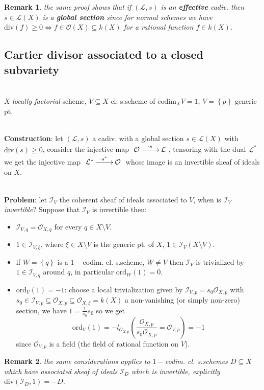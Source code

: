 \documentclass[oneside,a4paper,11pt]{amsbook}
\theoremstyle{pl}
\theoremstyle{df}
\theoremstyle{rm}
\newtheorem{rmk}{Remark}[chapter]
\newcommand{\nline}{
~\\
}%
\newcommand{\pa}[1]{
\left(#1\right)
}
\newcommand{\ga}[1]{
\left\{#1\right\}
}
\newcommand{\ol}[1]{
\overline{#1}
}
\newcommand{\mc}[1]{
\mathcal{#1}
}
\newcommand{\ord}[2]{
\text{ord}_{#1}\pa{#2}
}
\newcommand{\dv}[1]{
\text{div}\pa{#1}
}
\newcommand{\cod}[2]{
\text{codim}_{#1}{#2}
}
\begin{document}
\begin{rmk}
the same proof shows that if $\pa{\mc{L},s}$ is an \textbf{effective} cadiv. then $s\in\mc{L}(X)$ is a \textbf{global section} since for normal schemes we have $\dv{f}\ge 0\Longleftrightarrow f\in\mc{O}(X)\subseteq k(X)$ for a rational function $f\in k(X)$.
\end{rmk}

\subsection{Cartier divisor associated to a closed subvariety}
\nline
$X$ \emph{locally factorial} scheme, $V\subseteq X$ cl. s.scheme of $\cod{X}{V}=1$, $V=\ol{\ga{p}}$ generic pt. 
\nline
\textbf{Construction}: let $\pa{\mc{L},s}$ a cadiv. with a global section $s\in\mc{L}(X)$ with $\dv{s}\ge 0$, consider the injective map $\xymatrix{\mc{O}\ar[r]^{\cdot s} &\mc{L}\\}$, tensoring with the dual $\mc{L}^*$ we get the injective map $\xymatrix{\mc{L}^*\ar[r]^{\cdot s^*} &\mc{O}\\}$ whose image is an invertible sheaf of ideals on $X$.  

\nline
\textbf{Problem}: let $\mc{I}_V$ the coherent sheaf of ideals associated to $V$, when is $\mc{I}_V$ \emph{invertible}? Suppose that $\mc{I}_V$ is invertible then:
\begin{itemize}
\item{$\mc{I}_{V,q}=\mc{O}_{X,q}$ for every $q\in X\setminus V$.}
\item{$1\in\mc{I}_{V,\xi}$, where $\xi\in X\setminus V$ is the generic pt. of $X$, $1\in\mc{I}_V\pa{X\setminus V}$.}
\item{if $W=\ol{\ga{q}}$ is a $1-$codim. cl. s.scheme, $W\neq V$ then $\mc{I}_V$ is trivialized by $1\in\mc{I}_{V,q}$ around $q$, in particular $\ord{W}{1}=0$.}
\item{$\ord{V}{1}=-1$: choose a local trivialization given by $\mc{I}_{V,p}=s_0\mc{O}_{X,p}$ with $s_0\in\mc{I}_{V,p}\subseteq\mc{O}_{X,p}\subseteq\mc{O}_{X,\xi}=k(X)$ a non-vanishing (or simply non-zero) section, we have $1=\frac{1}{s_0}s_0$ so we get
\[
\ord{V}{1}=-l_{\mc{O}_{X,p}}\pa{\frac{\mc{O}_{X,p}}{s_0\mc{O}_{X,p}}=\mc{O}_{V,p}}=-1
\]
since $\mc{O}_{V,p}$ is a field (the field of rational function on $V$).}
\end{itemize} 

\begin{rmk}
the same considerations applies to $1-$codim. cl. s.schemes $D\subseteq X$ which have associated sheaf of ideals $\mc{I}_D$ which is invertible, explicitly $\dv{\mc{I}_D,1}=-D$.
\end{rmk}
\end{document}
